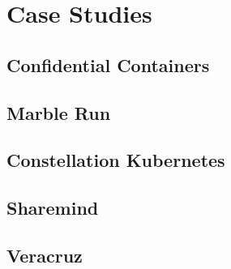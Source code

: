 \chapter{Case Studies}

\section{Confidential Containers}

\section{Marble Run}

\section{Constellation Kubernetes}

\section{Sharemind}

\section{Veracruz}
